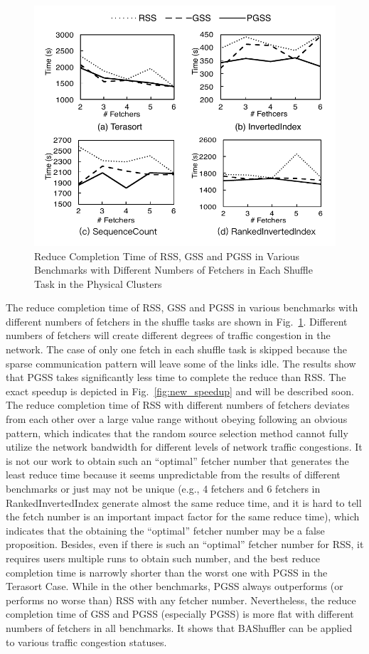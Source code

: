 \documentclass[10pt,journal,compsoc]{IEEEtran}
\begin{document}
\begin{figure}
\centering
\includegraphics[width=1\columnwidth]{figure7}
\caption{Reduce Completion Time of RSS, GSS and PGSS in Various Benchmarks with Different Numbers of Fetchers in Each Shuffle Task
in the Physical Clusters} 
\label{fig:new_reduce_completion}
\end{figure}


The reduce completion time of RSS, GSS and PGSS in various benchmarks with different numbers of fetchers in the shuffle tasks are shown in Fig.~\ref{fig:new_reduce_completion}. 
Different numbers of fetchers will create different degrees of traffic
congestion in the network. 
The case of only one fetch in each shuffle task is skipped because the
sparse communication pattern will leave some of the links idle.
The results show that PGSS takes significantly less
time to complete the reduce than RSS.
The exact speedup is depicted in Fig.~\ref{fig:new_speedup} and will be described soon.
The reduce completion time of RSS with different numbers of fetchers
deviates from each other over a large value range without obeying following an obvious pattern,
which indicates that the random source selection method cannot fully
utilize the network bandwidth for different levels of network traffic
congestions.
It is not our work to obtain such an ``optimal'' fetcher number that generates the least reduce time because it seems unpredictable from the results of different benchmarks or just may not be unique 
(e.g., 4 fetchers and 6 fetchers in RankedInvertedIndex generate almost the same reduce time, and it is hard to tell the fetch number is an important impact factor for the same reduce time), which indicates that the obtaining the ``optimal'' fetcher number may be a false proposition.
Besides, even if there is such an ``optimal'' fetcher number for RSS, it requires users multiple runs to obtain such number, and the best reduce completion time is narrowly shorter than the worst one with PGSS in the Terasort Case. 
While in the other benchmarks, PGSS always outperforms (or performs no worse than) RSS with any fetcher number. 
Nevertheless, the reduce completion time of GSS and PGSS (especially PGSS) is more flat
with different numbers of fetchers in all benchmarks.
It shows that BAShuffler can be applied to various traffic congestion statuses.
\end{document}
